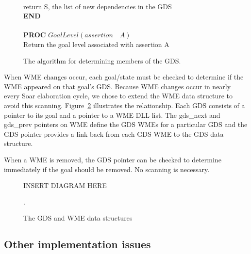 \begin{figure}[h]
{\begin{minipage}{\textwidth}
\begin{tabbing}
\\
\> return S, the list of new dependencies in the GDS \\ 
\textbf{END} \\



\\
\textbf{PROC} $GoalLevel(assertion \quad A)$ \\
\> Return the goal level associated with assertion A

\end{tabbing}
\end{minipage}
}
\caption{The algorithm for determining members of the GDS.}
\label{tab:dhj:proc}
\end{figure}


When WME changes occur, each goal/state must be checked to determine
if the WME appeared on that goal's GDS. Because WME changes occur in
nearly every Soar elaboration cycle, we chose to extend the WME data
structure to avoid this scanning.  Figure~\ref{wme} illustrates the
relationship.  Each GDS consists of a pointer to its goal and a
pointer to a WME DLL list.  The gds\_next and gds\_prev pointers on
WME define the GDS WMEs for a particular GDS and the GDS pointer
provides a link back from each GDS WME to the GDS data structure.

When a WME is removed, the GDS pointer can be checked to determine
immediately if the goal should be removed.  No scanning is necessary.


\begin{figure}
INSERT DIAGRAM HERE
\caption{The GDS and WME data structures}.
\label{wme}
\end{figure}

\subsection*{Other implementation issues}


